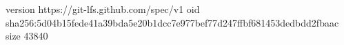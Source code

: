 version https://git-lfs.github.com/spec/v1
oid sha256:5d04b15fede41a39bda5e20b1dcc7e977bef77d247ffbf681453dedbdd2fbaac
size 43840
